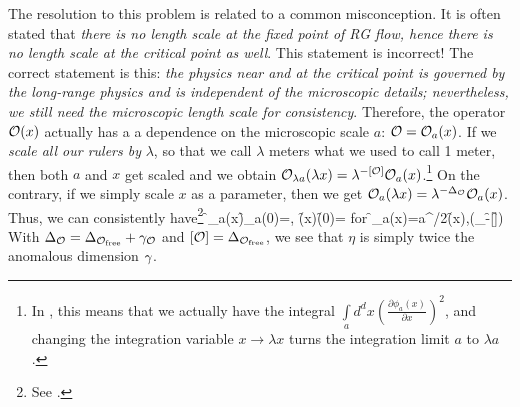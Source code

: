 The resolution to this problem is related to a common misconception. It is often stated that 
\emph{there is no length scale at the fixed point of RG flow, hence there is no length scale at the critical point as well}. This statement is incorrect! The correct statement is this: \emph{the physics near and at the critical point is governed by the long-range physics and is independent of the microscopic details; nevertheless, we still need the microscopic length scale for consistency}. Therefore, the operator $\mathcal{O}(x)$ actually has a a dependence on the microscopic scale $a$: $\mathcal{O}=\mathcal{O}_a(x)$. If we \emph{scale all our rulers by} $\lambda$, so that we call $\lambda$ meters what we used to call 1 meter, then both $a$ and $x$ get scaled and we obtain $\mathcal{O}_{\lambda a}(\lambda x)=\lambda^{-[\mathcal{O}]}\mathcal{O}_{a}(x)$.\footnote{In , this means that we actually have the integral $\int\limits_a d^dx\left(\frac{\partial\phi_a(x)}{\partial x}\right)^2$, and changing the integration variable $x\rightarrow \lambda x$ turns the integration limit $a$ to $\lambda a$.} On the contrary, if we simply scale $x$ as a parameter, then we get $\mathcal{O}_a(\lambda x)=\lambda^{-\Delta_{\mathcal{O}}}\mathcal{O}_a(x)$. Thus, we can consistently have\footnote{See .} 
\be 
\<\f_a(x)\f_a(0)\>=\;,\quad 
\<\f(x)\f(0)\>=
\ee 
for 
\be 
\f_a(x)=a^{\eta/2}\f(x)\;,\quad{}(\De_\f-[\f])
\ee 
With $\Delta_{\mathcal{O}}=\Delta_{\mathcal{O}_{\text{free}}}+\gamma_{\mathcal{O}}$ and $[\mathcal{O}]=\Delta_{\mathcal{O}_{\text{free}}}$, we see that $\eta$ is simply twice the anomalous dimension $\gamma$.

